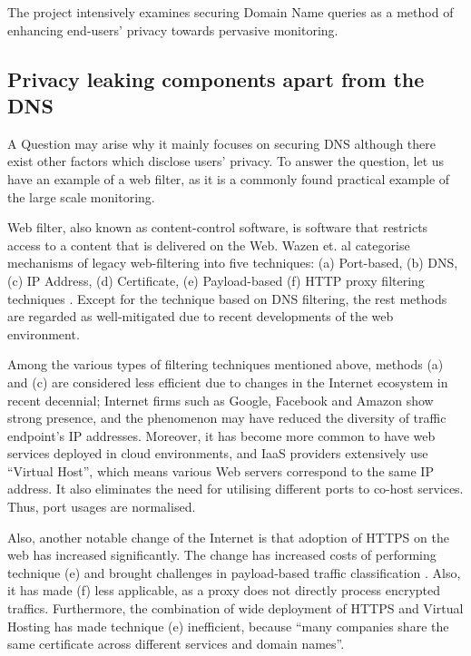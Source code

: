 The project intensively examines securing Domain Name queries as a method of enhancing end-users' privacy towards pervasive monitoring.

\subsection{Privacy leaking components apart from the DNS}
A Question may arise why it mainly focuses on securing DNS although there exist other factors which disclose users' privacy.
To answer the question, let us have an example of a web filter, as it is a commonly found practical example of the large scale monitoring\cite{murdoch2008tools}.

Web filter, also known as content-control software, is software that restricts access to a content that is delivered on the Web.
Wazen et. al categorise mechanisms of legacy web-filtering into five techniques: (a) Port-based, (b) DNS, (c) IP Address, (d) Certificate, (e) Payload-based (f) HTTP proxy filtering techniques \cite{shbair2015efficiently}.
Except for the technique based on DNS filtering, the rest methods are regarded as well-mitigated due to recent developments of the web environment. 

Among the various types of filtering techniques mentioned above, methods (a) and (c) are considered less efficient due to changes in the Internet ecosystem in recent decennial;
Internet firms such as Google, Facebook and Amazon show strong presence\cite{haucap2014google}, and the phenomenon may have reduced the diversity of traffic endpoint's IP addresses.
Moreover, it has become more common to have web services deployed in cloud environments\cite{clouds2018stat}, and IaaS providers extensively use ``Virtual Host\cite{virtual24host}'', which means various Web servers correspond to the same IP address.
It also eliminates the need for utilising different ports to co-host services. Thus, port usages are normalised.

Also, another notable change of the Internet is that adoption of HTTPS on the web has increased significantly\cite{felt2017measuring}.
The change has increased costs of performing technique (e) and brought challenges in payload-based traffic classification \cite{xue2013traffic}.
Also, it has made (f) less applicable, as a proxy does not directly process encrypted traffics\cite{shbair2015efficiently}.
Furthermore, the combination of wide deployment of HTTPS and Virtual Hosting has made technique (e) inefficient, because ``many companies share the same certificate across different services and domain names\cite{shbair2015efficiently}''.

